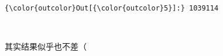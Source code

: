 \documentclass[11pt]{article}
\begin{document}
\begin{Verbatim}[commandchars=\\\{\}]
{\color{outcolor}Out[{\color{outcolor}5}]:} 1039114
\end{Verbatim}
            
    \begin{center}
    \end{center}
    { \hspace*{\fill} \\}
    
    其实结果似乎也不差（


    
    
    
    
\end{document}
